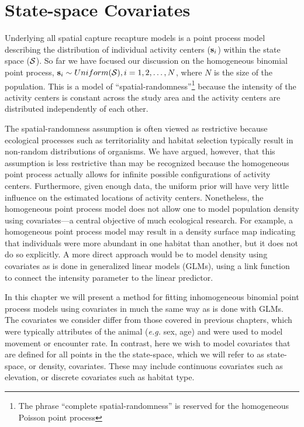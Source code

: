 


\chapter{State-space Covariates}
\label{chapt.state-space}

\vspace{0.3cm}

Underlying all spatial capture recapture models is a point process
model describing the distribution of individual activity
centers (${\bf s}_i$) within the state space ($\cal{S}$). So far we have focused our
discussion on the homogeneous binomial point process,
${\bf s}_i \sim Uniform({\cal S}), i=1,2,\dots,N$, where $N$ is the
size of the population. This is a model of
``spatial-randomness''\footnote{The phrase ``complete
  spatial-randomness'' is reserved for the homogeneous Poisson point
  process}
because the intensity of the
activity centers is constant across the study area and the activity
centers are distributed independently of each other.

The spatial-randomness assumption is often viewed as restrictive
because ecological processes such as
territoriality and habitat selection typically result in non-random
distributions of organisms. We have argued, however, that this
assumption is less restrictive than may be recognized because the
homogeneous point process actually allows for infinite
possible configurations of activity centers. Furthermore, given enough data,
the uniform prior will have very little influence on the estimated
locations of activity centers. Nonetheless, the homogeneous point
process model does not allow one to model population density using
covariates---a central objective of much ecological research.
For example, a homogeneous point process model
may result in a density surface map indicating that individuals were
more abundant in one habitat than another, but it does not do so
explicitly. A more direct approach would be to model density using
covariates as is done in generalized linear models (GLMs), using a
link function to connect the intensity parameter to the linear predictor.

In this chapter we will present a method
for fitting inhomogeneous binomial point process models using
covariates in much the same way as is done with GLMs. The
covariates we consider differ
from those covered in previous chapters, which were typically
attributes of the animal ({\it e.g.} sex, age) and were used to model movement or encounter
rate. In contrast, here we wish to
model covariates that are defined for all points in the
the state-space, which we will refer to as
state-space, or density, covariates. These may
include continuous covariates such as elevation, or discrete
covariates such as habitat type.


